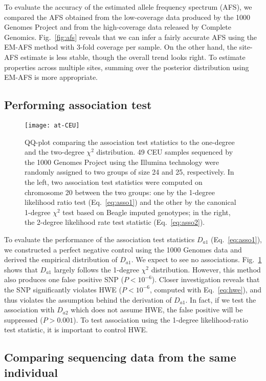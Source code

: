 \documentclass{bioinfo}
\begin{document}
To evaluate the accuracy of the estimated allele frequency spectrum (AFS), we
compared the AFS obtained from the low-coverage data produced by the 1000
Genomes Project and from the high-coverage data released by Complete Genomics.
Fig.~\ref{fig:afs} reveals that we can infer a fairly accurate AFS using the
EM-AFS method with 3-fold coverage per sample. On the other hand, the site-AFS
estimate is less stable, though the overall trend looks right. To estimate
properties across multiple sites, summing over the posterior distribution using EM-AFS is
more appropriate.

\subsection{Performing association test}
\begin{figure}[tb]
\centering
\texttt{[image: at-CEU]}
\caption{QQ-plot comparing the association test statistics to the one-degree
and the two-degree $\chi^2$ distribution.
49 CEU samples sequenced by the 1000 Genomes Project using the Illumina
technology were randomly assigned to two groups of size 24 and 25,
respectively.  In the left, two association test statistics were computed on chromosome 20
between the two groups: one by the 1-degree likelihood ratio test (Eq.~\ref{eq:asso1}) and the other
by the canonical 1-degree $\chi^2$ test based on Beagle imputed
genotypes; in the right, the 2-degree likelihood rate test statistic (Eq.~\ref{eq:asso2}).}\label{fig:at}
\end{figure}

To evaluate the performance of the association test statistics $D_{a1}$
(Eq.~\ref{eq:asso1}), we constructed a perfect negative control using the
1000 Genomes data and derived the empirical distribution of $D_{a1}$.
We expect to see no associations.
Fig.~\ref{fig:at} shows that $D_{a1}$ largely follows the 1-degree $\chi^2$
distribution.  However, this method also produces one false positive SNP
($P<10^{-6}$). Closer investigation reveals that the SNP significantly violates
HWE ($P<10^{-6}$, computed with Eq.~\eqref{eq:hwe}), and thus violates the
assumption behind the derivation of $D_{a1}$.  In fact, if we test the
association with $D_{a2}$ which does not assume HWE, the false positive will be
suppressed ($P>0.001$). To test association using the 1-degree likelihood-ratio
test statistic, it is important to control HWE.

\subsection{Comparing sequencing data from the same individual}
\end{document}
